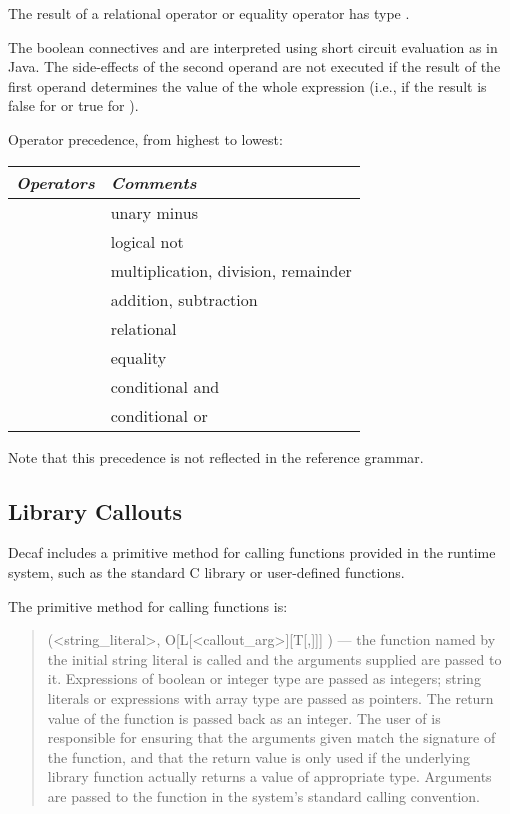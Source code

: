 The result of a relational operator or equality operator has type
.

The boolean connectives \term{\&\&} and \term{||} are interpreted using
short circuit evaluation as in Java.  The side-effects of the second
operand are not executed if the result of the first operand determines
the value of the whole expression (i.e., if the result is false for
\term{\&\&} or true for \term{||}).

Operator precedence, from highest to lowest:

\begin{center}
\begin{tabular}{|c|l|}
\hline
{\em Operators\/}  & {\em Comments\/} \\
\hline
\term{-}              & unary minus \\
\term{!}              & logical not \\
\term{* / \%}         & multiplication, division, remainder \\
\term{+ -}            & addition, subtraction \\
\term{<  <=   >=  >}  & relational \\
\term{==  !=}         &  equality \\
\term{\&\&}           & conditional and \\
\term{||}             & conditional or \\ \hline
\end{tabular}
\end{center}

Note that this precedence is not reflected in the reference grammar.

\subsection*{Library Callouts}

Decaf includes a primitive method for calling functions
provided in the runtime system, such as the standard C library or
user-defined functions.

The primitive method for calling functions is:

\begin{quotation}
\noindent {}  ({\bnf <string_literal>,
O[L[<callout_arg>][T[,]]]} ) --- the function named by the initial
string literal is called and the arguments supplied are passed to
it. Expressions of boolean or integer type are passed as integers;
string literals or expressions with array type are passed as
pointers. The return value of the function is passed back as an
integer. The user of  is responsible for ensuring that the
arguments given match the signature of the function, and that the return
value is only used if the underlying library function actually returns a
value of appropriate type. Arguments are passed to the function in the
system's standard calling convention.
\end{quotation}


